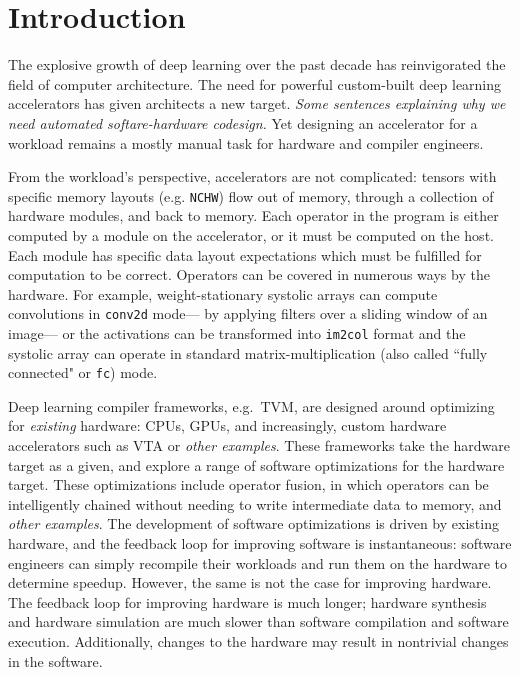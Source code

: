 \section{Introduction}

The explosive growth
  of deep learning
  over the past decade
  has reinvigorated the field
  of computer architecture.
 The need for powerful
  custom-built
  deep learning
  accelerators
  has given architects
  a new target.
\textit{Some sentences
  explaining
  why we need
  automated 
  softare-hardware codesign.}
Yet
  designing an accelerator
  for a workload
  remains
  a mostly manual task
  for hardware and compiler engineers.
  
From the workload's perspective,
  accelerators are not complicated:
  tensors with specific memory layouts
  (e.g. \texttt{NCHW})
  flow out of memory,
  through a collection of hardware modules,
  and back to memory.
Each operator in the program
  is either
  computed by a module
  on the accelerator,
  or it must be computed on the host.
Each module
  has specific data layout expectations
  which must be fulfilled
  for computation to be correct.
Operators
  can be covered in numerous ways
  by the hardware.
For example,
  weight-stationary systolic arrays
  can compute convolutions
  in \texttt{conv2d} mode---%
  by applying filters
  over a sliding window
  of an image---%
  or the activations can be transformed
  into \texttt{im2col} format
  and the systolic array can operate
  in standard
  matrix-multiplication
  (also called ``fully connected" or \texttt{fc})
  mode.
  
Deep learning compiler frameworks,
  e.g.~TVM\cite{tvm},
  are designed around optimizing
  for \textit{existing} hardware:
  CPUs, GPUs,
  and increasingly,
  custom hardware accelerators
  such as VTA\cite{vta} or \textit{other examples}.
These frameworks
  take the hardware target
  as a given,
  and explore a range 
  of software optimizations
  for the hardware target.
These optimizations include
  operator fusion,
  in which operators
  can be intelligently chained
  without needing to write intermediate data
  to memory,
  and \textit{other examples}.
The development
  of software optimizations
  is driven by existing hardware,
  and the feedback loop
  for improving software
  is instantaneous:
  software engineers
  can simply recompile their workloads
  and run them on the hardware
  to determine speedup.
However, 
  the same is not the case
  for improving hardware.
The feedback loop
  for improving hardware
  is much longer;
  hardware synthesis
  and hardware simulation
  are much slower
  than software compilation
  and software execution.
Additionally,
  changes to the hardware
  may result in 
  nontrivial changes 
  in the software.

